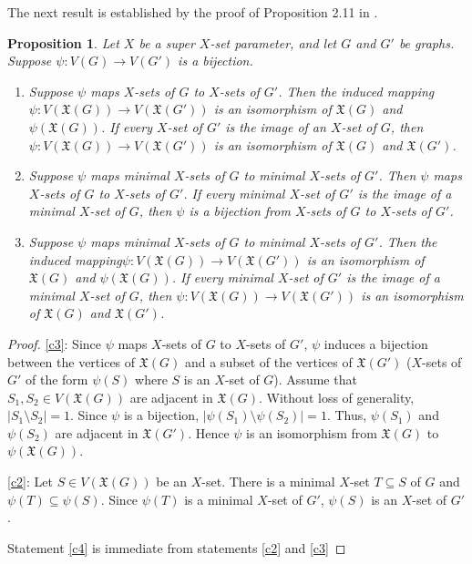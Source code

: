 \documentclass{article}
\def\blu{\color{blue}}
\numberwithin{figure}{section}
\numberwithin{table}{section}
\numberwithin{equation}{section}
\newtheorem{prop}[thm]{Proposition}
\theoremstyle{definition}
\theoremstyle{definition}
\theoremstyle{definition}
\newcommand{\ben}{\begin{enumerate}}
\newcommand{\een}{\end{enumerate}}
\newcommand{\bpf}{\begin{proof}}
\newcommand{\epf}{\end{proof}\ms}
\newcommand{\ms}{\medskip}
\newcommand{\xtar}{\mathfrak{X}}%
\begin{document}
{The next result is established by the proof of Proposition 2.11 in \cite{XTARiso} .
\begin{prop}\label{isomorph-minimal-u} Let $X$ be a super $X$-set parameter, and let $G$ and $G'$ be graphs.  
Suppose $\psi:V(G)\to V(G')$ is a bijection.
\ben[$(1)$]
\item\label{c3}  Suppose $\psi$ maps  $X$-sets of $G$ to  $X$-sets of $G'$. Then the induced mapping $\psi:V(\xtar(G))\to V(\xtar(G'))$ is an isomorphism of $\xtar(G)$ and $\psi(\xtar(G))$.   If every  $X$-set of $G'$ is the image of an $X$-set of $G$, then $\psi:V(\xtar(G))\to V(\xtar(G'))$ is an isomorphism of $\xtar(G)$ and $\xtar(G')$.
\item\label{c2} Suppose $\psi$  maps minimal $X$-sets of $G$ to minimal $X$-sets of $G'$.  Then  $\psi$ maps $X$-sets of $G$ to $X$-sets of $G'$. 
If every minimal $X$-set of $G'$ is the image of a minimal $X$-set of $G$, then  $\psi$ is a bijection from $X$-sets of $G$ to $X$-sets of $G'$. 
\item\label{c4} Suppose $\psi$  maps minimal $X$-sets of $G$ to minimal $X$-sets of $G'$.   Then the induced mapping\break $\psi:V(\xtar(G))\to V(\xtar(G'))$ is an isomorphism of $\xtar(G)$ and $\psi(\xtar(G))$.   If every minimal  $X$-set of $G'$ is the image of a minimal $X$-set of $G$, then $\psi:V(\xtar(G))\to V(\xtar(G'))$ is an isomorphism of $\xtar(G)$ and $\xtar(G')$.\een
\end{prop}

\bpf \blu  
\eqref{c3}: Since $\psi$ maps $X$-sets of $G$ to $X$-sets of $G'$,   $\psi$ induces a bijection between the vertices of $\xtar(G)$ and a subset of the vertices of  $\xtar(G')$ ($X$-sets of $G'$ of the form $\psi(S)$ where $S$ is an $X$-set of $G$). Assume that $S_1,S_2\in V(\xtar(G))$ are adjacent in $\xtar(G)$. Without loss of generality, $|S_1\setminus S_2|=1$. Since $\psi$ is a bijection, $|\psi(S_1)\setminus \psi(S_2)| = 1$. Thus, $\psi(S_1)$ and $\psi(S_2)$ are adjacent in $\xtar(G')$. Hence $\psi$ is an isomorphism from $\xtar(G)$ to $\psi(\xtar(G))$.

\eqref{c2}: %
Let $S\in V(\xtar(G))$ be an $X$-set. There is a minimal $X$-set  $T\subseteq S$ of $G$ and $\psi(T)\subseteq \psi(S)$. Since $\psi(T)$ is a minimal $X$-set  of $G'$, $\psi(S)$ is an $X$-set   of $G'$.

Statement \eqref{c4} is immediate from statements \eqref{c2} and \eqref{c3}
\epf

}
\end{document}
